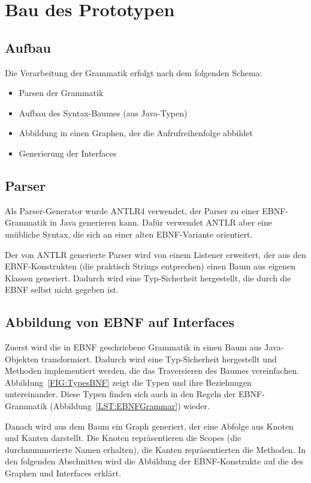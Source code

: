 \documentclass[../InterneDSLs.tex]{subfiles}
\begin{document}
\chapter{Bau des Prototypen}

\section{Aufbau}
Die Verarbeitung der Grammatik erfolgt nach dem folgenden Schema:
\begin{itemize}
	\item Parsen der Grammatik
	\item Aufbau des Syntax-Baumes (aus Java-Typen)
	\item Abbildung in einen Graphen, der die Aufrufreihenfolge abbildet
	\item Generierung der Interfaces
\end{itemize}

\section{Parser}
Als Parser-Generator wurde ANTLR4 verwendet, der Parser zu einer EBNF-Grammatik in Java generieren kann. Dafür verwendet ANTLR aber eine unübliche Syntax, die sich an einer alten EBNF-Variante orientiert.

Der von ANTLR generierte Parser wird von einem Listener erweitert, der aus den EBNF-Konstrukten (die praktisch Strings entprechen) einen Baum aus eigenen Klassen generiert. Dadurch wird eine Typ-Sicherheit hergestellt, die durch die EBNF selbst nicht gegeben ist.

\section{Abbildung von EBNF auf Interfaces}
Zuerst wird die in EBNF geschriebene Grammatik in einen Baum aus Java-Objekten transformiert. Dadurch wird eine Typ-Sicherheit hergestellt und Methoden implementiert werden, die das Traversieren des Baumes vereinfachen. Abbildung~\ref{FIG:TypesBNF} zeigt die Typen und ihre Beziehungen untereinander. Diese Typen finden sich auch in den Regeln der EBNF-Grammatik (Abbildung~\ref{LST:EBNFGrammar}) wieder.

Danach wird aus dem Baum ein Graph generiert, der eine Abfolge aus Knoten und Kanten darstellt. Die Knoten repräsentieren die Scopes (die durchnummerierte Namen erhalten), die Kanten repräsentierten die Methoden. In den folgenden Abschnitten wird die Abbildung der EBNF-Konstrukte auf die des Graphen und Interfaces erklärt.
\end{document}
